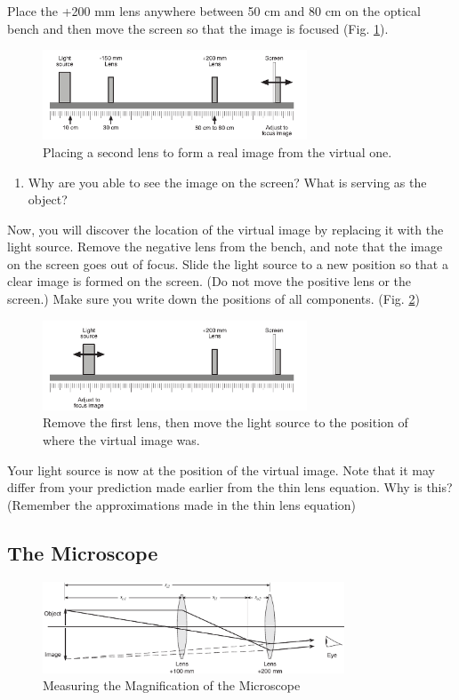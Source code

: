 \noindent Place the +200 mm lens anywhere between 50 cm and 80 cm on the optical bench and then move the screen so that the image is focused (Fig. \ref{virt2}).
\begin{figure}[h]
\centering
\includegraphics[width=0.7\textwidth]{./Exp7/pic/virtual-2.png}
\caption{Placing a second lens to form a real image from the virtual one.}
\label{virt2}
\end{figure}

\begin{enumerate}
\item Why are you able to see the image on the screen? What is serving as the object?
\end{enumerate}

Now, you will discover the location of the virtual image by replacing it with the light source. Remove the negative lens from the bench, and note that the image on the screen goes out of focus. Slide the light source to a new position so that a clear image is formed on the screen. (Do not move the positive lens or the screen.) Make sure you write down the positions of all components. (Fig. \ref{virtu3})

\begin{figure}[h]
\centering
\includegraphics[width=0.7\textwidth]{./Exp7/pic/virtual-3.png}
\caption{Remove the first lens, then move the light source to the position of where the virtual image was.}
\label{virtu3}
\end{figure}

Your light source is now at the position of the virtual image. Note that it may differ from your prediction made earlier from the thin lens equation. Why is this? (Remember the approximations made in the thin lens equation)


\subsection{The Microscope}
\myskip
\begin{figure}[h]
\centering
\includegraphics[width=0.8\textwidth]{./Exp7/pic/image9a.png}
\caption{Measuring the Magnification of the Microscope}
\label{fig:microscope}
\end{figure}

